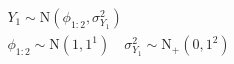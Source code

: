 \begin{equation}
\begin{gathered}
  Y_{1} \sim \text{N}(\phi_{1:2}, \sigma^{2}_{Y_{1}}) \\
  \phi_{1:2} \sim \text{N}(1, 1^1) \quad
  \sigma^{2}_{Y_{1}} \sim \text{N}_{+}(0, 1^2)
  \label{eqn:model-1-specification}  
\end{gathered}
\end{equation}